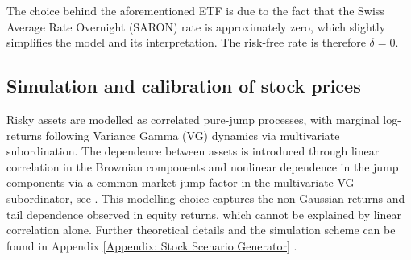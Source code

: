 The choice behind the aforementioned ETF is due to the fact that the Swiss Average Rate Overnight (SARON) rate is approximately zero, which slightly simplifies the model and its interpretation. The risk-free rate is therefore $\delta=0$. 

\subsection{Simulation and calibration of stock prices}
Risky assets are modelled as correlated pure-jump processes, with marginal log-returns following Variance Gamma (VG) dynamics via multivariate subordination. The dependence between assets is introduced through linear correlation in the Brownian components and nonlinear dependence in the jump components via a common market-jump factor in the multivariate VG subordinator, see \cite{LUCIANO20101937, Luciano02072016}. This modelling choice captures the non-Gaussian returns and tail dependence observed in equity returns, which cannot be explained by linear correlation alone. Further theoretical details and the simulation scheme can be found in Appendix \ref{Appendix: Stock Scenario Generator} .

